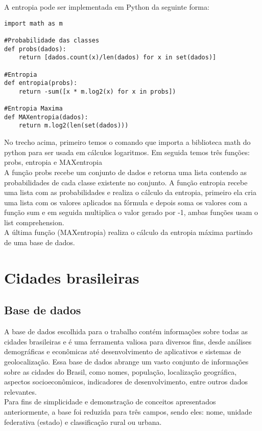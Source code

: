 \documentclass{article}
\begin{document}
A entropia pode ser implementada em Python da seguinte forma:\\

\begin{verbatim}
import math as m

#Probabilidade das classes
def probs(dados):
    return [dados.count(x)/len(dados) for x in set(dados)]

#Entropia
def entropia(probs):
    return -sum([x * m.log2(x) for x in probs])

#Entropia Maxima
def MAXentropia(dados):
    return m.log2(len(set(dados)))
\end{verbatim}

No trecho acima, primeiro temos o comando que importa a biblioteca math do python para ser usada em cálculos logaritmos. Em seguida temos três funções: probs, entropia e MAXentropia\\
\newpage
A função probs recebe um conjunto de dados e retorna uma lista contendo as probabilidades de cada classe existente no conjunto. A função entropia recebe uma lista com as probabilidades e realiza o cálculo da entropia, primeiro ela cria uma lista com os valores aplicados na fórmula e depois soma os valores com a função sum e em seguida multiplica o valor gerado por -1, ambas funções usam o list comprehension.\\

A última função (MAXentropia) realiza o cálculo da entropia máxima partindo de uma base de dados.

\section{Cidades brasileiras}
\subsection{Base de dados}
A base de dados escolhida para o trabalho contém informações sobre todas as cidades brasileiras e é uma ferramenta valiosa para diversos fins, desde análises demográficas e econômicas até desenvolvimento de aplicativos e sistemas de geolocalização. Essa base de dados abrange um vasto conjunto de informações sobre as cidades do Brasil, como nomes, população, localização geográfica, aspectos socioeconômicos, indicadores de desenvolvimento, entre outros dados relevantes.\\

Para fins de simplicidade e demonstração de conceitos apresentados anteriormente, a base foi reduzida para três campos, sendo eles: nome, unidade federativa (estado) e classificação rural ou urbana.\\
\end{document}
